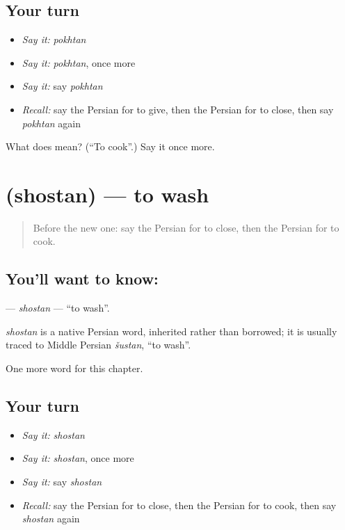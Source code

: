 \subsection*{Your turn}
\begin{itemize}
\raggedright
  \item \emph{Say it:} \emph{pokhtan}
  \item \emph{Say it:} \emph{pokhtan}, once more
  \item \emph{Say it:} say \emph{pokhtan}
  \item \emph{Recall:} say the Persian for to give, then the Persian for to close, then say \emph{pokhtan} again
\end{itemize}

\begin{tcolorbox}[breakable,colback=teal!4,colframe=teal!35!black,title={Before you move on}]
What does  mean? (\textquotedblleft{}To cook\textquotedblright{}.) Say it once more.
\end{tcolorbox}
\section[\texorpdfstring{\fa{شستن} (shostan)}{شستن (shostan)}]{ (shostan) — to wash}

\label{lesson:FA-C37-shostan}



\begin{quote}
Before the new one: say the Persian for to close, then the Persian for to cook.
\end{quote}

\subsection*{You'll want to know: }
\textbf{} — \emph{shostan} — \textquotedblleft{}to wash\textquotedblright{}.

\begin{cousinweb}
\emph{shostan} is a native Persian word, inherited rather than borrowed; it is usually traced to Middle Persian \emph{šustan}, \textquotedblleft{}to wash\textquotedblright{}.
\end{cousinweb}

\begin{grammarlens}[title={What you've built}]
One more word for this chapter.
\end{grammarlens}

\subsection*{Your turn}
\begin{itemize}
\raggedright
  \item \emph{Say it:} \emph{shostan}
  \item \emph{Say it:} \emph{shostan}, once more
  \item \emph{Say it:} say \emph{shostan}
  \item \emph{Recall:} say the Persian for to close, then the Persian for to cook, then say \emph{shostan} again
\end{itemize}

